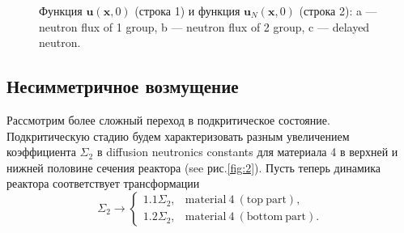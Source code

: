\documentclass[authoryear]{elsarticle}
\begin{document}
\begin{figure}[!h]
\begin{center}
\begin{minipage}{0.3\linewidth}
 \\
\end{minipage}

\begin{minipage}{0.051\linewidth}
\center{ } \\
\end{minipage}
\hfill
\begin{minipage}{0.3\linewidth}
 \\
\end{minipage}
\hfill
\begin{minipage}{0.3\linewidth}
 \\
\end{minipage}
\hfill
\begin{minipage}{0.3\linewidth}
 \\
\end{minipage}
\hfill

\caption{Функция $\bm u(\bm x, 0)$ (строка 1) и функция  $\bm u_N(\bm x, 0)$ (строка 2):
a --- neutron flux of 1 group, b --- neutron flux of 2 group, c --- delayed neutron.}
\label{fig:11}
  \end{center}
\end{figure}

\subsection{Несимметричное возмущение} 

Рассмотрим более сложный переход в подкритическое состояние.
Подкритическую стадию будем характеризовать 
разным увеличением коэффициента 
$\Sigma_2$ в diffusion neutronics constants  для материала 4 в верхней и нижней половине сечения реактора
(see рис.\ref{fig:2}). Пусть теперь динамика реактора соответствует трансформации
\[
 \Sigma_2 \longrightarrow 
 \begin{cases}
 1.1 \Sigma_2, & \mathrm{material \ 4 \ (top \ part)}, \\
 1.2 \Sigma_2, & \mathrm{material \ 4 \ (bottom \ part)}.
 \end{cases}
\] 
\end{document}
